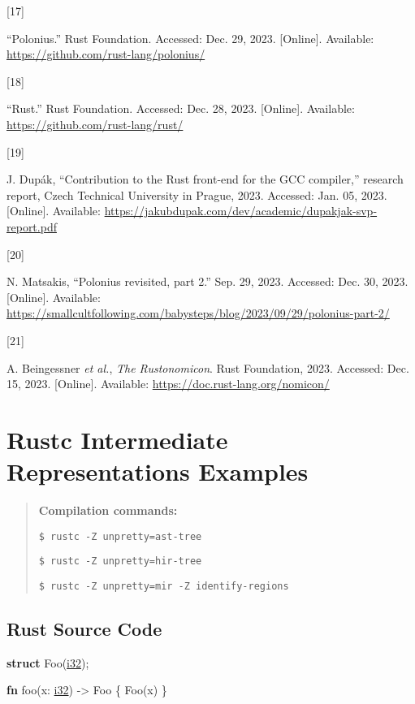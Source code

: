 \documentclass[
  11pt,
  twoside,symmetric]{report}
\newenvironment{Shaded}{}{}
\newcommand{\DataTypeTok}[1]{\underline{#1}}
\newcommand{\KeywordTok}[1]{\textbf{#1}}
\newcommand{\NormalTok}[1]{#1}
\newcommand{\OperatorTok}[1]{#1}
\newlength{\cslhangindent}
\newlength{\csllabelwidth}
\newenvironment{CSLReferences}[2] %
 {\begin{list}{}{%
  \setlength{\itemindent}{0pt}
  \setlength{\leftmargin}{0pt}
  \setlength{\parsep}{0pt}
  \ifodd #1
   \setlength{\leftmargin}{\cslhangindent}
   \setlength{\itemindent}{-1\cslhangindent}
  \fi
  \setlength{\itemsep}{#2\baselineskip}}}
 {\end{list}}
\newcommand{\CSLLeftMargin}[1]{\parbox[t]{\csllabelwidth}{\strut#1\strut}}
\newcommand{\CSLRightInline}[1]{\parbox[t]{\linewidth - \csllabelwidth}{\strut#1\strut}}
\begin{document}
\begin{CSLReferences}{0}{0}
\CSLLeftMargin{{[}17{]} }%
\CSLRightInline{{``Polonius.''} Rust Foundation. Accessed: Dec. 29,
2023. {[}Online{]}. Available:
\url{https://github.com/rust-lang/polonius/}}

\CSLLeftMargin{{[}18{]} }%
\CSLRightInline{{``Rust.''} Rust Foundation. Accessed: Dec. 28, 2023.
{[}Online{]}. Available: \url{https://github.com/rust-lang/rust/}}

\CSLLeftMargin{{[}19{]} }%
\CSLRightInline{J. Dupák, {``Contribution to the {R}ust front-end for
the {GCC} compiler,''} research report, Czech Technical University in
Prague, 2023. Accessed: Jan. 05, 2023. {[}Online{]}. Available:
\url{https://jakubdupak.com/dev/academic/dupakjak-svp-report.pdf}}

\CSLLeftMargin{{[}20{]} }%
\CSLRightInline{N. Matsakis, {``Polonius revisited, part 2.''} Sep. 29,
2023. Accessed: Dec. 30, 2023. {[}Online{]}. Available:
\url{https://smallcultfollowing.com/babysteps/blog/2023/09/29/polonius-part-2/}}

\CSLLeftMargin{{[}21{]} }%
\CSLRightInline{A. Beingessner \emph{et al.}, \emph{The {R}ustonomicon}.
Rust Foundation, 2023. Accessed: Dec. 15, 2023. {[}Online{]}. Available:
\url{https://doc.rust-lang.org/nomicon/}}

\end{CSLReferences}

\chapter{Rustc Intermediate Representations
Examples}\label{rustc-intermediate-representations-examples}

\begin{quote}
\textbf{Compilation commands:}

\texttt{\$\ rustc\ -Z\ unpretty=ast-tree}

\texttt{\$\ rustc\ -Z\ unpretty=hir-tree}

\texttt{\$\ rustc\ -Z\ unpretty=mir\ -Z\ identify-regions}
\end{quote}

\section{Rust Source Code}\label{rust-source-code}

\begin{Shaded}
\begin{Highlighting}[]
    \KeywordTok{struct}\NormalTok{ Foo(}\DataTypeTok{i32}\NormalTok{)}\OperatorTok{;}

    \KeywordTok{fn}\NormalTok{ foo(x}\OperatorTok{:} \DataTypeTok{i32}\NormalTok{) }\OperatorTok{{-}\textgreater{}}\NormalTok{ Foo }\OperatorTok{\{}
\NormalTok{        Foo(x)}
    \OperatorTok{\}}
\end{Highlighting}
\end{Shaded}
\end{document}
